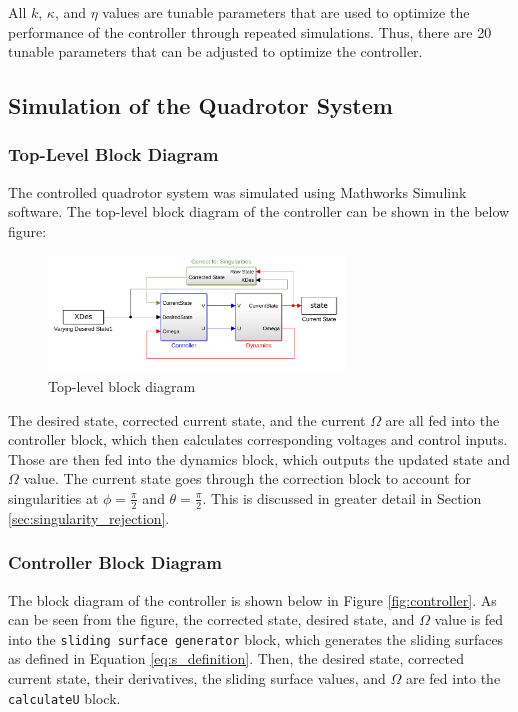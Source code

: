 \documentclass[12pt]{article}
\begin{document}
All $k$, $\kappa$, and $\eta$ values are tunable parameters that are used to optimize the performance of the controller through repeated simulations. Thus, there are 20 tunable parameters that can be adjusted to optimize the controller.

\subsection{Simulation of the Quadrotor System}
\subsubsection{Top-Level Block Diagram}
The controlled quadrotor system was simulated using Mathworks Simulink software. The top-level block diagram of the controller can be shown in the below figure:

\begin{center}
\begin{figure}[H]
\captionsetup{width=1\textwidth}
\centering
\includegraphics[width=0.70\textwidth]{overview.png}
\caption{\label{fig:overview}Top-level block diagram}
\end{figure}
\end{center}

The desired state, corrected current state, and the current $\Omega$ are all fed into the controller block, which then calculates corresponding voltages and control inputs. Those are then fed into the dynamics block, which outputs the updated state and $\Omega$ value. The current state goes through the correction block to account for singularities at $\phi = \frac{\pi}{2}$ and $\theta = \frac{\pi}{2}$. This is discussed in greater detail in Section \ref{sec:singularity_rejection}.

\subsubsection{Controller Block Diagram}
The block diagram of the controller is shown below in Figure \ref{fig:controller}. As can be seen from the figure, the corrected state, desired state, and $\Omega$ value is fed into the \texttt{sliding surface generator} block, which generates the sliding surfaces as defined in Equation \ref{eq:s_definition}. Then, the desired state, corrected current state, their derivatives, the sliding surface values, and $\Omega$ are fed into the \texttt{calculateU} block. 
\end{document}
